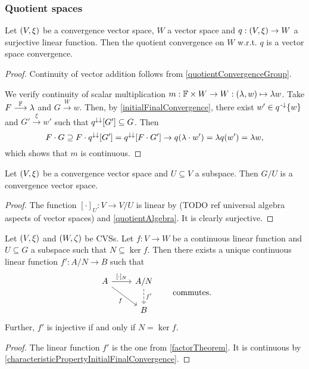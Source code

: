 \subsubsection{Quotient spaces}
\begin{proposition}
Let $\left( V, \xi \right)$ be a convergence vector space, $W$ a vector space and $q: \left( V, \xi \right) \to W$ a surjective linear function. Then the quotient convergence on $W$ w.r.t. $q$ is a vector space convergence.
\end{proposition}
\begin{proof}
Continuity of vector addition follows from
\ref{quotientConvergenceGroup}.

We verify continuity of scalar multiplication $m: \mathbb{F}\times W \to W: (\lambda, w) \mapsto \lambda w$. Take $F\overset{\mathbb{F}}{\longrightarrow}\lambda$ and $G \overset{W}{\longrightarrow} w$. Then, by \ref{initialFinalConvergence}, there exist $w'\in q^{{\text{\hspace{0.15em}-}\downarrow}}\{w\}$ and $G' \overset{\xi}{\longrightarrow} w'$ such that $q^{\downarrow\downarrow}[G'] \subseteq G$. Then
\[ F\cdot G \supseteq F\cdot q^{\downarrow\downarrow}[G'] = q^{\downarrow\downarrow}[F\cdot G'] \to q(\lambda \cdot w') = \lambda q(w') = \lambda w, \]
which shows that $m$ is continuous.
\end{proof}
\begin{corollary}
Let $\left( V,\xi \right)$ be a convergence vector space and $U\subseteq V$ a subspace. Then $G/U$ is a convergence vector space.
\end{corollary}
\begin{proof}
The function $[\cdot]_U: V\to V/U$ is linear by (TODO ref universal algebra aspects of vector spaces) and \ref{quotientAlgebra}. It is clearly surjective.
\end{proof}
\begin{corollary}
Let $\left( V, \xi \right)$ and $\left( W, \zeta \right)$ be CVSs. Let $f: V\to W$ be a continuous linear function and $U\subseteq G$ a subspace such that $N\subseteq \ker f$. Then there exists a unique continuous linear function $f': A/N \to B$ such that
\[ \begin{tikzcd}
A \arrow[r, "{[\cdot]_N}"] \arrow[dr, swap, "f"] & A/N \arrow[d, dashed, "{f'}"] \\
& B
\end{tikzcd} \qquad\text{commutes.} \]
Further, $f'$ is injective \textup{if and only if} $N = \ker f$.
\end{corollary}
\begin{proof}
The linear function $f'$ is the one from \ref{factorTheorem}. It is continuous by \ref{characteristicPropertyInitialFinalConvergence}.
\end{proof}

